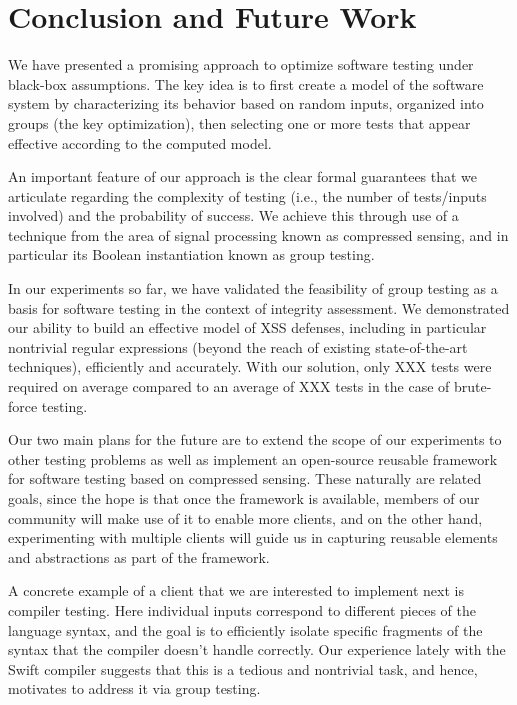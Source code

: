 \section{Conclusion and Future Work}

We have presented a promising approach to optimize software testing under black-box assumptions. The key idea is to first create a model of the software system by characterizing its behavior based on random inputs, organized into groups (the key optimization), then selecting one or more tests that appear effective according to the computed model.

An important feature of our approach is the clear formal guarantees that we articulate regarding the complexity of testing (i.e., the number of tests/inputs involved) and the probability of success. We achieve this through use of a technique from the area of signal processing known as compressed sensing, and in particular its Boolean instantiation known as group testing.

In our experiments so far, we have validated the feasibility of group testing as a basis for software testing in the context of integrity assessment. We demonstrated our ability to build an effective model of XSS defenses, including in particular nontrivial regular expressions (beyond the reach of existing state-of-the-art techniques), efficiently and accurately. With our solution, only XXX tests were required on average compared to an average of XXX tests in the case of brute-force testing.

Our two main plans for the future are to extend the scope of our experiments to other testing problems as well as implement an open-source reusable framework for software testing based on compressed sensing. These naturally are related goals, since the hope is that once the framework is available, members of our community will make use of it to enable more clients, and on the other hand, experimenting with multiple clients will guide us in capturing reusable elements and abstractions as part of the framework.

A concrete example of a client that we are interested to implement next is compiler testing. Here individual inputs correspond to different pieces of the language syntax, and the goal is to efficiently isolate specific fragments of the syntax that the compiler doesn't handle correctly. Our experience lately with the Swift compiler suggests that this is a tedious and nontrivial task, and hence, motivates to address it via group testing.